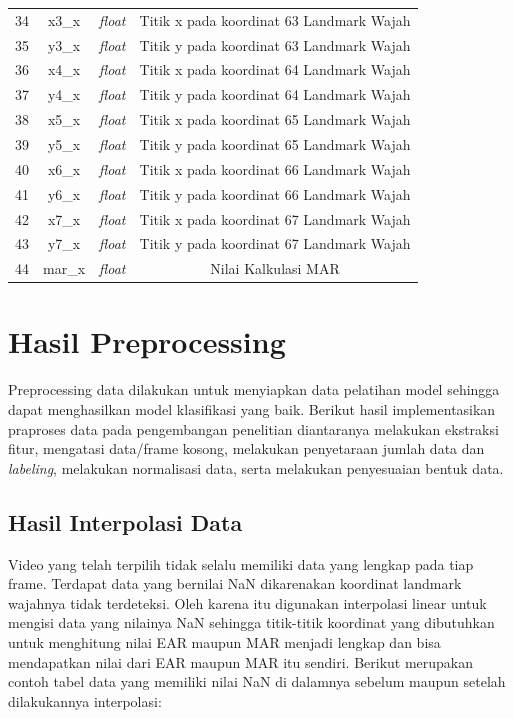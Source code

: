 \begin{longtable}{|c|c|c|c|}
  34          & x3\_x               & \textit{float}     & Titik x pada koordinat 63 Landmark Wajah \\
  35          & y3\_x               & \textit{float}     & Titik y pada koordinat 63 Landmark Wajah \\
  36          & x4\_x               & \textit{float}     & Titik x pada koordinat 64 Landmark Wajah \\
  37          & y4\_x               & \textit{float}     & Titik y pada koordinat 64 Landmark Wajah \\
  38          & x5\_x               & \textit{float}     & Titik x pada koordinat 65 Landmark Wajah \\
  39          & y5\_x               & \textit{float}     & Titik y pada koordinat 65 Landmark Wajah \\
  40          & x6\_x               & \textit{float}     & Titik x pada koordinat 66 Landmark Wajah \\
  41          & y6\_x               & \textit{float}     & Titik y pada koordinat 66 Landmark Wajah \\
  42          & x7\_x               & \textit{float}     & Titik x pada koordinat 67 Landmark Wajah \\
  43          & y7\_x               & \textit{float}     & Titik y pada koordinat 67 Landmark Wajah \\
  44          & mar\_x              & \textit{float}     & Nilai Kalkulasi MAR                      \\
  \hline
\end{longtable}

\section{Hasil Preprocessing}

Preprocessing data dilakukan untuk menyiapkan data pelatihan model sehingga dapat menghasilkan
model klasifikasi yang baik. Berikut hasil implementasikan praproses data pada pengembangan penelitian
diantaranya melakukan ekstraksi fitur, mengatasi data/frame kosong, melakukan penyetaraan jumlah data
dan \emph{labeling}, melakukan normalisasi data, serta melakukan penyesuaian bentuk data.

\subsection{Hasil Interpolasi Data}
Video yang telah terpilih tidak selalu memiliki data yang lengkap pada tiap frame. Terdapat data yang
bernilai NaN dikarenakan koordinat landmark wajahnya tidak terdeteksi. Oleh karena itu digunakan interpolasi
linear untuk mengisi data yang nilainya NaN sehingga titik-titik koordinat yang dibutuhkan untuk menghitung
nilai EAR maupun MAR menjadi lengkap dan bisa mendapatkan nilai dari EAR maupun MAR itu sendiri. Berikut
merupakan contoh tabel data yang memiliki nilai NaN di dalamnya sebelum maupun setelah dilakukannya
interpolasi:

